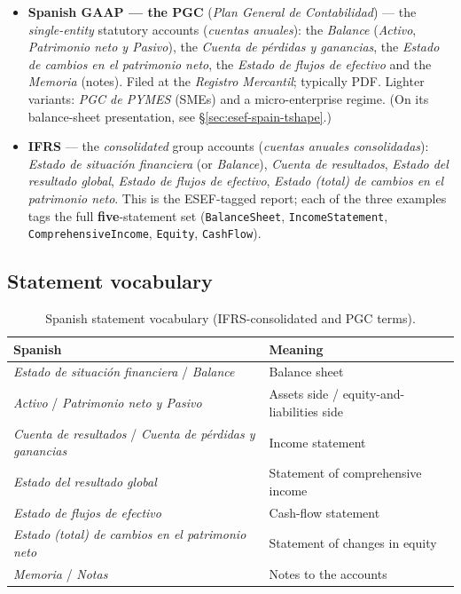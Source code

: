 \documentclass[11pt,a4paper]{report}
\begin{document}
\begin{itemize}
  \item \textbf{Spanish GAAP --- the PGC} (\emph{Plan General de Contabilidad}) --- the \emph{single-entity}
    statutory accounts (\emph{cuentas anuales}): the \emph{Balance} (\emph{Activo}, \emph{Patrimonio neto y
    Pasivo}), the \emph{Cuenta de pérdidas y ganancias}, the \emph{Estado de cambios en el patrimonio neto},
    the \emph{Estado de flujos de efectivo} and the \emph{Memoria} (notes). Filed at the \emph{Registro
    Mercantil}; typically PDF. Lighter variants: \emph{PGC de PYMES} (SMEs) and a micro-enterprise regime.
    (On its balance-sheet presentation, see \S\ref{sec:esef-spain-tshape}.)
  \item \textbf{IFRS} --- the \emph{consolidated} group accounts (\emph{cuentas anuales consolidadas}):
    \emph{Estado de situación financiera} (or \emph{Balance}), \emph{Cuenta de resultados}, \emph{Estado del
    resultado global}, \emph{Estado de flujos de efectivo}, \emph{Estado (total) de cambios en el patrimonio
    neto}. This is the ESEF-tagged report; each of the three examples tags the full \textbf{five}-statement
    set (\texttt{BalanceSheet}, \texttt{IncomeStatement}, \texttt{ComprehensiveIncome}, \texttt{Equity},
    \texttt{CashFlow}).
\end{itemize}

\subsection{Statement vocabulary}

\begin{table}[h]
\centering
\caption{Spanish statement vocabulary (IFRS-consolidated and PGC terms).}
\label{tab:es-vocab}
\small
\begin{tabular}{@{}p{}p{}@{}}
\toprule
\textbf{Spanish} & \textbf{Meaning} \\
\midrule
\emph{Estado de situación financiera} / \emph{Balance} & Balance sheet \\
\emph{Activo} / \emph{Patrimonio neto y Pasivo} & Assets side / equity-and-liabilities side \\
\emph{Cuenta de resultados} / \emph{Cuenta de pérdidas y ganancias} & Income statement \\
\emph{Estado del resultado global} & Statement of comprehensive income \\
\emph{Estado de flujos de efectivo} & Cash-flow statement \\
\emph{Estado (total) de cambios en el patrimonio neto} & Statement of changes in equity \\
\emph{Memoria} / \emph{Notas} & Notes to the accounts \\
\bottomrule
\end{tabular}
\end{table}
\end{document}
